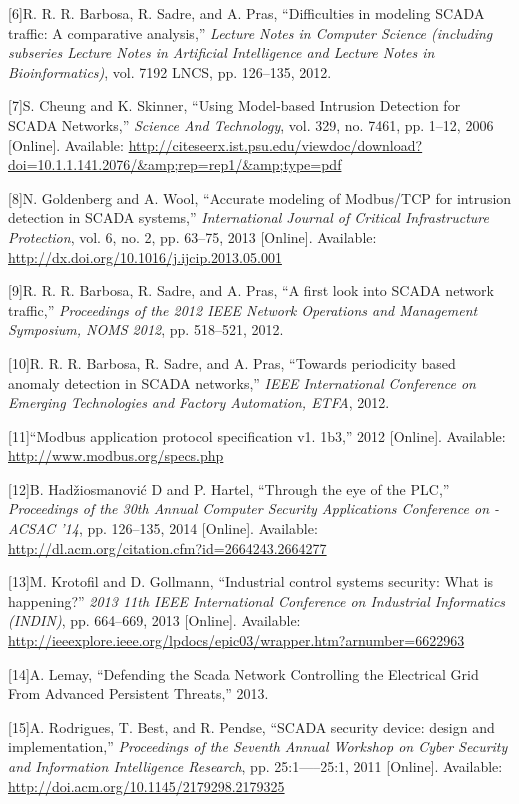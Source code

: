 \documentclass[12pt,]{article}
\begin{document}
{[}6{]}R. R. R. Barbosa, R. Sadre, and A. Pras, ``Difficulties in
modeling SCADA traffic: A comparative analysis,'' \emph{Lecture Notes in
Computer Science (including subseries Lecture Notes in Artificial
Intelligence and Lecture Notes in Bioinformatics)}, vol. 7192 LNCS, pp.
126--135, 2012.

{[}7{]}S. Cheung and K. Skinner, ``Using Model-based Intrusion Detection
for SCADA Networks,'' \emph{Science And Technology}, vol. 329, no. 7461,
pp. 1--12, 2006 {[}Online{]}. Available:
\url{http://citeseerx.ist.psu.edu/viewdoc/download?doi=10.1.1.141.2076/\&amp;rep=rep1/\&amp;type=pdf}

{[}8{]}N. Goldenberg and A. Wool, ``Accurate modeling of Modbus/TCP for
intrusion detection in SCADA systems,'' \emph{International Journal of
Critical Infrastructure Protection}, vol. 6, no. 2, pp. 63--75, 2013
{[}Online{]}. Available:
\url{http://dx.doi.org/10.1016/j.ijcip.2013.05.001}

{[}9{]}R. R. R. Barbosa, R. Sadre, and A. Pras, ``A first look into
SCADA network traffic,'' \emph{Proceedings of the 2012 IEEE Network
Operations and Management Symposium, NOMS 2012}, pp. 518--521, 2012.

{[}10{]}R. R. R. Barbosa, R. Sadre, and A. Pras, ``Towards periodicity
based anomaly detection in SCADA networks,'' \emph{IEEE International
Conference on Emerging Technologies and Factory Automation, ETFA}, 2012.

{[}11{]}``Modbus application protocol specification v1. 1b3,'' 2012
{[}Online{]}. Available: \url{http://www.modbus.org/specs.php}

{[}12{]}B. Hadžiosmanović D and P. Hartel, ``Through the eye of the
PLC,'' \emph{Proceedings of the 30th Annual Computer Security
Applications Conference on - ACSAC '14}, pp. 126--135, 2014
{[}Online{]}. Available:
\url{http://dl.acm.org/citation.cfm?id=2664243.2664277}

{[}13{]}M. Krotofil and D. Gollmann, ``Industrial control systems
security: What is happening?'' \emph{2013 11th IEEE International
Conference on Industrial Informatics (INDIN)}, pp. 664--669, 2013
{[}Online{]}. Available:
\url{http://ieeexplore.ieee.org/lpdocs/epic03/wrapper.htm?arnumber=6622963}

{[}14{]}A. Lemay, ``Defending the Scada Network Controlling the
Electrical Grid From Advanced Persistent Threats,'' 2013.

{[}15{]}A. Rodrigues, T. Best, and R. Pendse, ``SCADA security device:
design and implementation,'' \emph{Proceedings of the Seventh Annual
Workshop on Cyber Security and Information Intelligence Research}, pp.
25:1-----25:1, 2011 {[}Online{]}. Available:
\url{http://doi.acm.org/10.1145/2179298.2179325}
\end{document}
